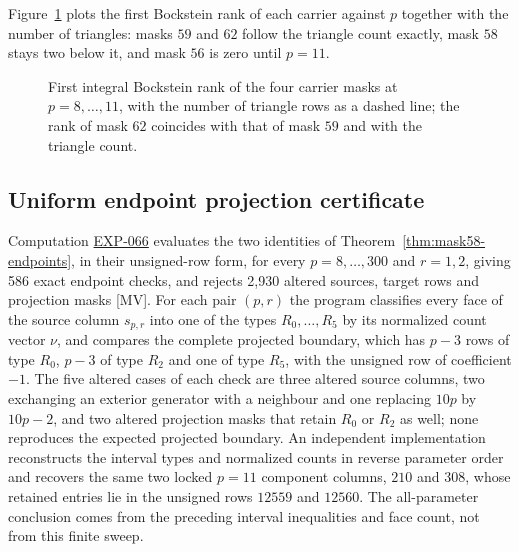 \documentclass[11pt]{article}
\theoremstyle{definition}
\theoremstyle{remark}
\newcommand{\Exp}[2]{\href{https://github.com/fsantibanezleal/CAOS_RESEARCH/tree/main/problems/commutative-algebra/huneke-wiegand/experiments/#1}{#2}}
\begin{document}
Figure~\ref{fig:bockstein} plots the first Bockstein rank of each carrier against $p$ together with the number of triangles: masks $59$ and $62$ follow the triangle count exactly, mask $58$ stays two below it, and mask $56$ is zero until $p=11$.

\begin{figure}[t]
\centering
{}
\caption{First integral Bockstein rank of the four carrier masks at $p=8,\ldots,11$, with the number of triangle rows as a dashed line; the rank of mask $62$ coincides with that of mask $59$ and with the triangle count.}
\label{fig:bockstein}
\end{figure}

\subsection{Uniform endpoint projection certificate}

Computation \Exp{EXP-066-uniform-endpoint-face-collapse}{EXP-066} evaluates the two identities of
Theorem~\ref{thm:mask58-endpoints}, in their unsigned-row form, for
every $p=8,\ldots,300$ and $r=1,2$, giving 586
exact endpoint checks, and rejects 2,930 altered sources, target rows and
projection masks [MV]. For each pair $(p,r)$ the program classifies every face of
the source column $s_{p,r}$ into one of the types $R_0,\ldots,R_5$ by its normalized count
vector $\nu$, and compares the complete projected boundary, which has $p-3$ rows of
type $R_0$, $p-3$ of type $R_2$ and one of type $R_5$, with the unsigned row of coefficient $-1$.
The five altered cases of each check are three altered source columns, two exchanging an exterior
generator with a neighbour and one replacing $10p$ by $10p-2$, and two altered projection masks
that retain $R_0$ or $R_2$ as well; none reproduces the expected projected boundary.
An independent implementation reconstructs the interval
types and normalized counts in reverse parameter order and recovers the same
two locked $p=11$ component columns, $210$ and $308$, whose retained entries lie in the
unsigned rows $12559$ and $12560$. The all-parameter conclusion comes from
the preceding interval inequalities and face count, not from this finite sweep.
\end{document}
